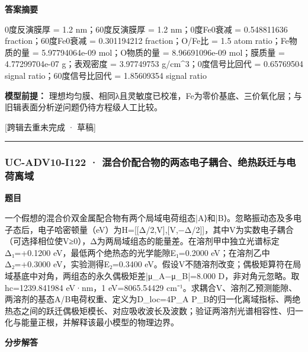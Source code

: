 \documentclass[UTF8,11pt,a4paper]{ctexart}
\begin{document}
\noindent\textbf{答案摘要}\par
0度反演膜厚 = 1.2 nm；60度反演膜厚 = 1.2 nm；0度Fe0衰减 = 0.548811636 fraction；60度Fe0衰减 = 0.301194212 fraction；O/Fe比 = 1.5 atom ratio；Fe物质的量 = 5.97794064e-09 mol；O物质的量 = 8.96691096e-09 mol；膜质量 = 4.77299704e-07 g；表观密度 = 3.97749753 g/cm\textasciicircum{}3；0度信号比回代 = 0.65769504 signal ratio；60度信号比回代 = 1.85609354 signal ratio\par
\noindent\textbf{模型前提：}
理想均匀膜、相同λ且灵敏度已校准，Fe为零价基底、三价氧化层；与旧辑表面分析逆问题仍待方程级人工比较。\par
\noindent\textcolor{red!65!black}{[跨辑去重未完成 · 草稿]} \par
\medskip\hrule\medskip
{}
\subsubsection*{UC-ADV10-I122 · 混合价配合物的两态电子耦合、绝热跃迁与电荷离域}
\noindent\textbf{题目}\par
一个假想的混合价双金属配合物有两个局域电荷组态|A⟩和|B⟩。忽略振动态及多电子态后，电子哈密顿量（eV）为H=[[Δ/2,V],[V,−Δ/2]]，其中V为实数电子耦合（可选择相位使V≥0），Δ为两局域组态的能量差。在溶剂甲中独立光谱标定Δ₁=+0.1200 eV，最低两个绝热态的光学能隙E₁=0.2000 eV；在溶剂乙中Δ₂=+0.3000 eV，实验测得E₂=0.3400 eV。假设V不随溶剂改变；偶极矩算符在局域基底中对角，两组态的永久偶极矩差|μ\_A−μ\_B|=8.000 D，非对角元忽略。取hc=1239.841984 eV·nm，1 eV=8065.54429 cm⁻¹。求耦合V、溶剂乙预测能隙、两溶剂的基态A/B电荷权重、定义为D\_loc=4P\_A P\_B的归一化离域指标、两绝热态之间的跃迁偶极矩模长、对应吸收波长及波数；验证两溶剂光谱相容性、归一化与能量正根，并解释该最小模型的物理边界。\par
\medskip\noindent\textbf{分步解答}
\end{document}
